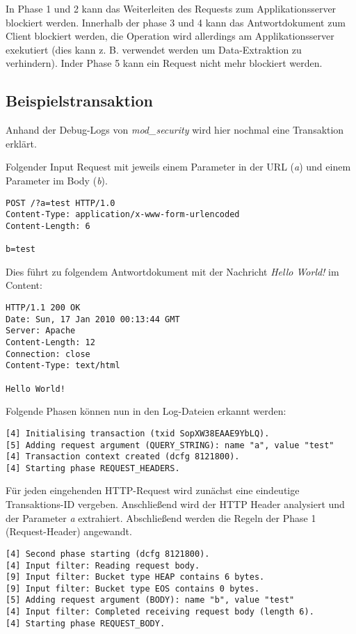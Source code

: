 In Phase 1 und 2 kann das Weiterleiten des Requests zum Applikationsserver blockiert werden. Innerhalb der phase 3 und 4 kann das Antwortdokument zum Client blockiert werden, die Operation wird allerdings am Applikationsserver exekutiert (dies kann z. B. verwendet werden um Data-Extraktion zu verhindern). Inder Phase 5 kann ein Request nicht mehr blockiert werden.

\subsection{Beispielstransaktion}

Anhand der Debug-Logs von \textit{mod\_security} wird hier nochmal eine Transaktion erklärt.

Folgender Input Request mit jeweils einem Parameter in der URL (\textit{a}) und einem Parameter im Body (\textit{b}).

\begin{verbatim}
POST /?a=test HTTP/1.0
Content-Type: application/x-www-form-urlencoded
Content-Length: 6

b=test
\end{verbatim}

Dies führt zu folgendem Antwortdokument mit der Nachricht \textit{Hello World!} im Content:

\begin{verbatim}
HTTP/1.1 200 OK
Date: Sun, 17 Jan 2010 00:13:44 GMT
Server: Apache
Content-Length: 12
Connection: close
Content-Type: text/html

Hello World!
\end{verbatim}

Folgende Phasen können nun in den Log-Dateien erkannt werden:

\begin{verbatim}
[4] Initialising transaction (txid SopXW38EAAE9YbLQ).
[5] Adding request argument (QUERY_STRING): name "a", value "test"
[4] Transaction context created (dcfg 8121800).
[4] Starting phase REQUEST_HEADERS.
\end{verbatim}

Für jeden eingehenden HTTP-Request wird zunächst eine eindeutige Transaktions-ID vergeben. Anschließend wird der HTTP Header analysiert und der Parameter \textit{a} extrahiert. Abschließend werden die Regeln der Phase 1 (Request-Header) angewandt.

\begin{verbatim}
[4] Second phase starting (dcfg 8121800).
[4] Input filter: Reading request body.
[9] Input filter: Bucket type HEAP contains 6 bytes.
[9] Input filter: Bucket type EOS contains 0 bytes.
[5] Adding request argument (BODY): name "b", value "test"
[4] Input filter: Completed receiving request body (length 6).
[4] Starting phase REQUEST_BODY.
\end{verbatim}

